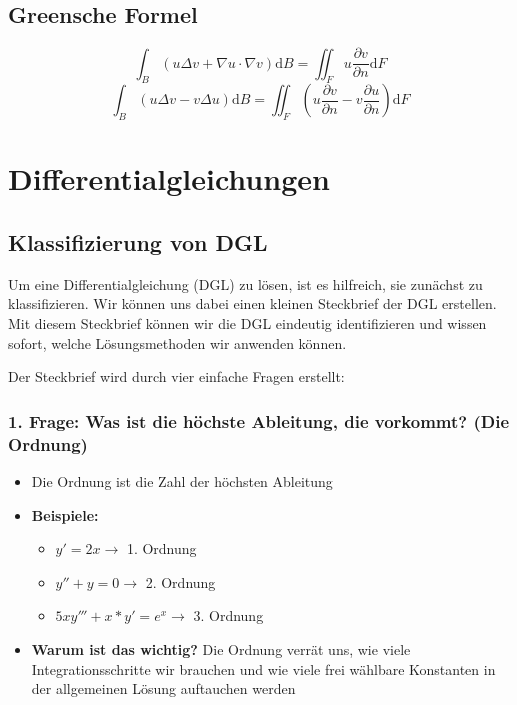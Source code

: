 \documentclass[a4paper,11pt,oneside,open=any,parskip=half, DIV=15]{scrreprt}
\begin{document}
\section{Greensche Formel}

   \begin{importantbox}
      \[
         \int_B \left( u \Delta v + \nabla u \cdot \nabla v \right) \mathrm{d}B = \iint_F u \frac{\partial v}{\partial n} \mathrm{d}F
      \]
      \[
         \int_B \left( u \Delta v - v \Delta u \right) \mathrm{d}B = \iint_F \left( u \frac{\partial v}{\partial n} - v \frac{\partial u}{\partial n} \right) \mathrm{d}F
      \]
   \end{importantbox}   

\chapter{Differentialgleichungen}

\section{Klassifizierung von DGL}

   Um eine Differentialgleichung (DGL) zu lösen, ist es hilfreich, sie zunächst zu klassifizieren. Wir können uns dabei einen kleinen Steckbrief der DGL erstellen. Mit diesem Steckbrief können wir die DGL eindeutig identifizieren und wissen sofort, welche Lösungsmethoden wir anwenden können. 

   \vspace{0.5cm}

   Der Steckbrief wird durch vier einfache Fragen erstellt:

   \subsection*{1. Frage: Was ist die höchste Ableitung, die vorkommt? (Die Ordnung)}

      \begin{itemize}
         \item Die Ordnung ist die Zahl der höchsten Ableitung
         \item \textbf{Beispiele:}
         \begin{itemize}
            \item \(y' = 2x \rightarrow\) 1. Ordnung
            \item \(y'' + y = 0 \rightarrow\) 2. Ordnung
            \item \(5xy''' + x*y' = e^x \rightarrow\) 3. Ordnung  %
         \end{itemize}
         \item \textbf{Warum ist das wichtig?} Die Ordnung verrät uns, wie viele Integrationsschritte wir brauchen und wie viele frei wählbare Konstanten in der allgemeinen Lösung auftauchen werden
      \end{itemize}
\end{document}
